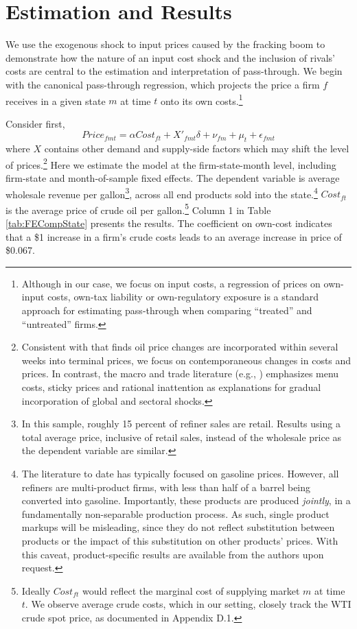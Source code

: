 \documentclass[12pt]{article}
\begin{document}
\section{Estimation and Results \label{sec:Results}}

We use the exogenous shock to input prices caused by the fracking boom to demonstrate how the nature of an input cost shock and the inclusion of rivals' costs are central to the estimation and interpretation of pass-through.  We begin with the canonical pass-through regression, which projects the price a firm $f$ receives in a given state $m$ at time $t$ onto its own costs.\footnote{
Although in our case, we focus on input costs, a regression of prices on own-input costs, own-tax liability or own-regulatory exposure is a standard approach for estimating pass-through when comparing ``treated'' and ``untreated'' firms.}

Consider first,
\begin{equation}
Price_{fmt}=\alpha Cost_{ft}+X'_{fmt}\delta + \nu_{fm} + \mu_t +\epsilon_{fmt} \label{eq:PT_own}
\end{equation}
where $X$ contains other demand and supply-side factors which may shift the level of prices.\footnote{Consistent with \citet{borenstein_gasoline_1997} that finds oil price changes are incorporated within several weeks into terminal prices, we focus on contemporaneous changes in costs and prices.  In contrast, the macro and trade literature (e.g., \citet{boivin2009sticky,mackowiak2009sectoral,andrade2016global}) emphasizes menu costs, sticky prices and rational inattention as explanations for gradual incorporation of global and sectoral shocks.} Here we estimate the model at the firm-state-month level, including firm-state and month-of-sample fixed effects. The dependent variable is average wholesale revenue per gallon\footnote{In this sample, roughly 15 percent of refiner sales are retail. Results using a total average price, inclusive of retail sales, instead of the wholesale price as the dependent variable are similar.}, across all end products sold into the state.\footnote{The literature to date has typically focused on gasoline prices. However, all refiners are multi-product firms, with less than half of a barrel being converted into gasoline. Importantly, these products are produced \emph{jointly}, in a fundamentally non-separable production process. As such, single product markups will be misleading, since they do not reflect substitution between products or the impact of this substitution on other products' prices. With this caveat, product-specific results are available from the authors upon request.} $Cost_{ft}$ is the average price of crude oil per gallon.\footnote{Ideally $Cost_{ft}$ would reflect the marginal cost of supplying market $m$ at time $t$. We observe average crude costs, which in our setting, closely track the WTI crude spot price, as documented in Appendix D.1.}  Column 1 in Table \ref{tab:FECompState} presents the results.  The coefficient on own-cost indicates that a \$1 increase in a firm's crude costs leads to an average increase in price of \$0.067.
\end{document}
